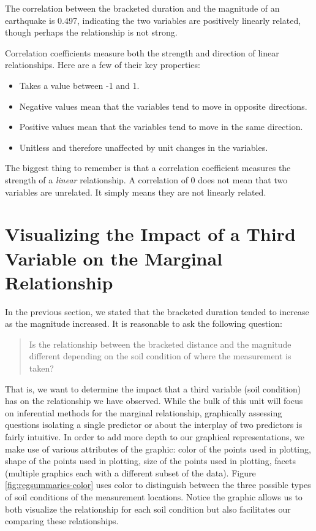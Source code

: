 \documentclass[]{book}
\providecommand{\tightlist}{%
  \setlength{\itemsep}{0pt}\setlength{\parskip}{0pt}}
\theoremstyle{plain}
\theoremstyle{mydefn}
\theoremstyle{myexmpl}
\theoremstyle{remark}
\let\BeginKnitrBlock\begin \let\EndKnitrBlock\end
\let\BeginKnitrBlock\begin \let\EndKnitrBlock\end
\begin{document}
The correlation between the bracketed duration and the magnitude of an
earthquake is 0.497, indicating the two variables are positively
linearly related, though perhaps the relationship is not strong.

\BeginKnitrBlock{rmdtip}
Correlation coefficients measure both the strength and direction of
linear relationships. Here are a few of their key properties:

\begin{itemize}
\tightlist
\item
  Takes a value between -1 and 1.
\item
  Negative values mean that the variables tend to move in opposite
  directions.
\item
  Positive values mean that the variables tend to move in the same
  direction.
\item
  Unitless and therefore unaffected by unit changes in the variables.
\end{itemize}

The biggest thing to remember is that a correlation coefficient measures
the strength of a \emph{linear} relationship. A correlation of 0 does
not mean that two variables are unrelated. It simply means they are not
linearly related.
\EndKnitrBlock{rmdtip}

\section{Visualizing the Impact of a Third Variable on the Marginal
Relationship}\label{visualizing-the-impact-of-a-third-variable-on-the-marginal-relationship}

In the previous section, we stated that the bracketed duration tended to
increase as the magnitude increased. It is reasonable to ask the
following question:

\begin{quote}
Is the relationship between the bracketed distance and the magnitude
different depending on the soil condition of where the measurement is
taken?
\end{quote}

That is, we want to determine the impact that a third variable (soil
condition) has on the relationship we have observed. While the bulk of
this unit will focus on inferential methods for the marginal
relationship, graphically assessing questions isolating a single
predictor or about the interplay of two predictors is fairly intuitive.
In order to add more depth to our graphical representations, we make use
of various attributes of the graphic: color of the points used in
plotting, shape of the points used in plotting, size of the points used
in plotting, facets (multiple graphics each with a different subset of
the data). Figure \ref{fig:regsummaries-color} uses color to distinguish
between the three possible types of soil conditions of the measurement
locations. Notice the graphic allows us to both visualize the
relationship for each soil condition but also facilitates our comparing
these relationships.
\end{document}

